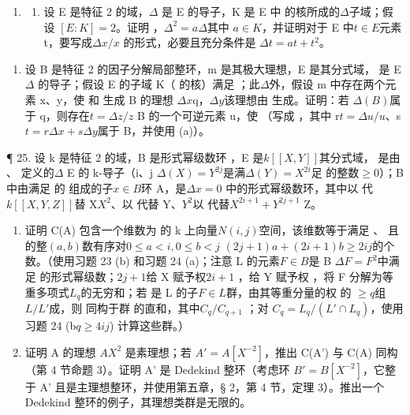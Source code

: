 \begin{enumerate}
\def\labelenumi{\arabic{enumi}.}
\setcounter{enumi}{23}
\tightlist
\item
  \begin{enumerate}
  \def\labelenumii{(\alph{enumii})}
  \tightlist
  \item
    设 E 是特征 2 的域，\(\Delta\) 是 E 的导子，K 是 E 中  的核所成的\(\Delta\)子域；假设 \([E:K]=2\)。证明 ，\(\Delta^{2}=a\Delta\)其中 \(a\in K\)，并证明对于 E 中\(t\in E\)元素 t，要写成\(\Delta x/x\)  的形式，必要且充分条件是 \(\Delta t=at+t^{2}\)。
  \end{enumerate}
\end{enumerate}

\begin{enumerate}
\def\labelenumi{(\alph{enumi})}
\setcounter{enumi}{1}
\tightlist
\item
  设 B 是特征 2 的因子分解局部整环，m 是其极大理想，E 是其分式域， 是 E\(\Delta\) 的导子；假设 E 的子域 K（ 的核）满足 ；此\(\Delta\)外，假设 {}m{ }中存在两个元素 x、y，使  和  生成 B 的理想 \(\Delta x\)q，\(\Delta y\)该理想由  生成。证明：若  \(\Delta(B)\)属于 q，则存在\(t = \Delta z / z\) B 的一个可逆元素 u，使 （写成 ，其中 r\(t = \Delta u / u\)、s \(t = r \Delta x + s \Delta y\)属于 B，并使用 (a)）。
\end{enumerate}

¶ 25. 设 k 是特征 2 的域，B 是形式幂级数环 ，E 是\(k[[X,Y]]\)其分式域， 是由 、 定义的\(\Delta\) E 的 k-导子（i、j \(\Delta(X)=Y^{2j}\)是满\(\Delta(Y)=X^{2i}\)足  的整数\(\geqslant0\)）；B 中由满足  的  组成的子\(x\in B\)环 A，是\(\Delta x=0\)  中的形式幂级数环，其中以  代\(k[[X,Y,Z]]\)替 X\(X^{2}\)、以  代替 Y、\(Y^{2}\)以  代替\(X^{2i+1}+Y^{2j+1}\) Z。

\begin{enumerate}
\def\labelenumi{(\alph{enumi})}
\item
  证明 C(A) 包含一个维数为  的 k 上向量\(N(i,j)\)空间，该维数等于满足 、 且  的整\((a,b)\)数有序对\(0 \leqslant a < i, 0 \leqslant b < j\)  \((2j + 1)a + (2i + 1)b \geqslant 2ij\)的个数。（使用习题 23 (b) 和习题 24 (a)；注意 L 的元素\(F \in B\)是 B \(\Delta F = F^{2}\)中满足  的形式幂级数；\(2j + 1\)给 X 赋予权\(2i + 1\) ，给 Y 赋予权 ，将 F 分解为等重多项式\(L_{q}\)的无穷和；若  是 L 的子\(F \in L\)群，由其等重分量的权  的  \(\geqslant q\)组\(L/L'\)成，则  同构于群  的直和，其中\(C_{q}/C_{q+1}\) ；对 \(C_{q} = L_{q}/(L' \cap L_{q})\)，使用习题 24 (b\(q \geqslant 4ij\)) 计算这些群。）
\item
证明 A 的理想 \(AX^{2}\) 是素理想；若 \(A' = A[X^{-2}]\)，推出 C(A') 与 C(A) 同构（第 4 节命题 3）。证明 A' 是 Dedekind 整环（考虑环 \(B' = B[X^{-2}]\)，它整于 A' 且是主理想整环，并使用第五章，§ 2，第 4 节，定理 3）。推出一个 Dedekind 整环的例子，其理想类群是无限的。
\end{enumerate}

